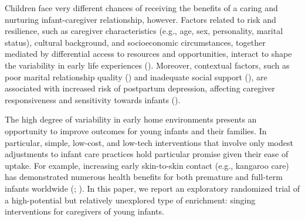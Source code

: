 \documentclass[
]{article}
\begin{document}
Children face very different chances of receiving the benefits of a
caring and nurturing infant-caregiver relationship, however. Factors
related to risk and resilience, such as caregiver characteristics (e.g.,
age, sex, personality, marital status), cultural background, and
socioeconomic circumstances, together mediated by differential access to
resources and opportunities, interact to shape the variability in early
life experiences ().
Moreover, contextual factors, such as poor marital relationship quality
() and inadequate social
support (), are associated
with increased risk of postpartum depression, affecting caregiver
responsiveness and sensitivity towards infants
().

The high degree of variability in early home environments presents an
opportunity to improve outcomes for young infants and their families. In
particular, simple, low-cost, and low-tech interventions that involve
only modest adjustments to infant care practices hold particular promise
given their ease of uptake. For example, increasing early skin-to-skin
contact (e.g., kangaroo care) has demonstrated numerous health benefits
for both premature and full-term infants worldwide
(;
). In this paper, we report
an exploratory randomized trial of a high-potential but relatively
unexplored type of enrichment: singing interventions for caregivers of
young infants.
\end{document}
